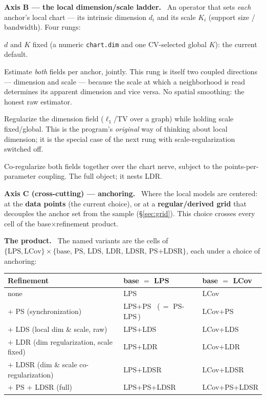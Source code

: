 \documentclass[11pt]{article}
\newcommand{\field}[1]{\smallskip\noindent\textbf{\textsf{#1.}}\ }
\begin{document}
\field{Axis B --- the local dimension/scale ladder} An operator that sets
\emph{each} anchor's local chart --- its intrinsic dimension $d_i$ and its scale
$K_i$ (support size / bandwidth). Four rungs:
\begin{description}[leftmargin=1.1em,style=nextline]
\item[base] $d$ and $K$ fixed (a numeric \texttt{chart.dim} and one CV-selected
global $K$): the current default.
\item[LDS --- local dimension \emph{and} scale, unregularized] Estimate \emph{both}
fields per anchor, jointly. This rung is itself two coupled directions --- dimension
and scale --- because the scale at which a neighborhood is read determines its
apparent dimension and vice versa. No spatial smoothing: the honest raw estimator.
\item[LDR --- local dimension regularization] Regularize the dimension field
($\ell_1$/TV over a graph) while holding scale fixed/global. This is the
program's \emph{original} way of thinking about local dimension; it is the special
case of the next rung with scale-regularization switched off.
\item[LDSR --- local dimension \emph{and} scale regularization] Co-regularize both
fields together over the chart nerve, subject to the points-per-parameter coupling.
The full object; it nests LDR.
\end{description}

\field{Axis C (cross-cutting) --- anchoring} Where the local models are centered:
at the \textbf{data points} (the current choice), or at a \textbf{regular/derived
grid} that decouples the anchor set from the sample (\S\ref{sec:grid}). This choice
crosses every cell of the base$\times$refinement product.

\field{The product} The named variants are the cells of
$\{\text{LPS},\text{LCov}\}\times\{\text{base},\,\text{PS},\,\text{LDS},\,\text{LDR},
\,\text{LDSR},\,\text{PS+LDSR}\}$, each under a choice of anchoring:

\begin{center}\small
\renewcommand{\arraystretch}{1.25}
\begin{tabular}{@{}l l l@{}}
\toprule
\textbf{Refinement} & \textbf{base $=$ LPS} & \textbf{base $=$ LCov}\\
\midrule
none & LPS & LCov\\
$+$ PS (synchronization) & LPS+PS \ (\,$=$ PS-LPS\,) & LCov+PS\\
$+$ LDS (local dim \& scale, raw) & LPS+LDS & LCov+LDS\\
$+$ LDR (dim regularization, scale fixed) & LPS+LDR & LCov+LDR\\
$+$ LDSR (dim \& scale co-regularization) & LPS+LDSR & LCov+LDSR\\
$+$ PS $+$ LDSR (full) & LPS+PS+LDSR & LCov+PS+LDSR\\
\bottomrule
\end{tabular}
\end{center}
\end{document}
